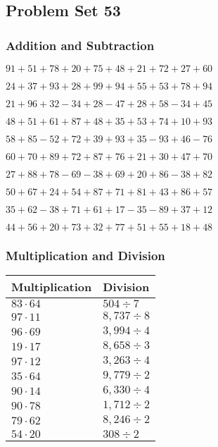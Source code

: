 \hypertarget{problem-set-53}{%
\subsection{Problem Set 53}\label{problem-set-53}}

\hypertarget{addition-and-subtraction}{%
\subsubsection{Addition and
Subtraction}\label{addition-and-subtraction}}

\(91+51+78+20+75+48+21+72+27+60\)

\(24+37+93+28+99+94+55+53+78+94\)

\(21+96+32-34+28-47+28+58-34+45\)

\(48+51+61+87+48+35+53+74+10+93\)

\(58+85-52+72+39+93+35-93+46-76\)

\(60+70+89+72+87+76+21+30+47+70\)

\(27+88+78-69-38+69+20+86-38+82\)

\(50+67+24+54+87+71+81+43+86+57\)

\(35+62-38+71+61+17-35-89+37+12\)

\(44+56+20+73+32+77+51+55+18+48\)

\hypertarget{multiplication-and-division}{%
\subsubsection{Multiplication and
Division}\label{multiplication-and-division}}

\begin{longtable}[]{@{}ll@{}}
\toprule
Multiplication & Division\tabularnewline
\midrule
\endhead
\(83\cdot64\) & \(504÷7\)\tabularnewline
\(97\cdot11\) & \(8,737÷8\)\tabularnewline
\(96\cdot69\) & \(3,994÷4\)\tabularnewline
\(19\cdot17\) & \(8,658÷3\)\tabularnewline
\(97\cdot12\) & \(3,263÷4\)\tabularnewline
\(35\cdot64\) & \(9,779÷2\)\tabularnewline
\(90\cdot14\) & \(6,330÷4\)\tabularnewline
\(90\cdot78\) & \(1,712÷2\)\tabularnewline
\(79\cdot62\) & \(8,246÷2\)\tabularnewline
\(54\cdot20\) & \(308÷2\)\tabularnewline
\bottomrule
\end{longtable}
